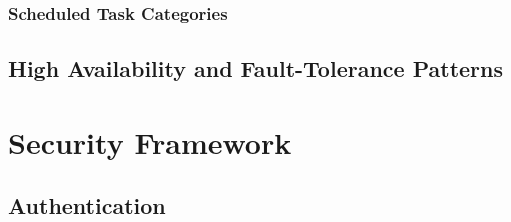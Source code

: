 \documentclass[a4paper,twoside]{sapthesis}
\begin{document}
\subsection{Scheduled Task Categories}
%
%
%
%
%

\section{High Availability and Fault-Tolerance Patterns}
\label{sec:ha-ft}



\chapter{Security Framework}
\label{ch:security}


\section{Authentication}
\label{sec:authentication}
\end{document}
